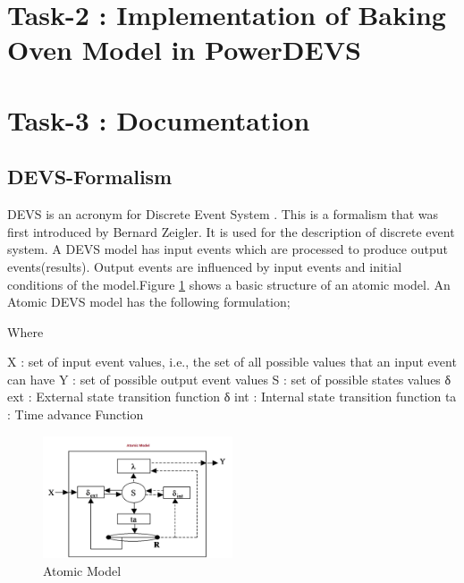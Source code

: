 \documentclass[titlepage]{article}%
\begin{document}
\section{Task-2 : Implementation of Baking Oven Model in PowerDEVS}




\section{Task-3 : Documentation}
\subsection{DEVS-Formalism}

DEVS is an acronym for Discrete Event System . This is a formalism that was first introduced by Bernard Zeigler. It is used for the description of discrete event system.  A DEVS model has input events which are processed to produce output events(results). Output events are influenced by  input events and  initial conditions of the model.Figure  \ref{atomic_model} shows a basic structure of an atomic model.  An Atomic DEVS model has the following formulation;

Where

X 		: set of input event values, i.e., the set of all possible values that
		an input event can have
Y 		: set of possible output event values
S 		: set of possible states values
δ ext 	: External state transition function
δ int 	: Internal state transition function
ta	  	: Time advance  Function

\begin{figure}[h!]
  \centering
    \includegraphics[width=0.5\textwidth]{Fig1.png}
    \caption{Atomic Model}
    \label{atomic_model}
\end{figure}
\end{document}
